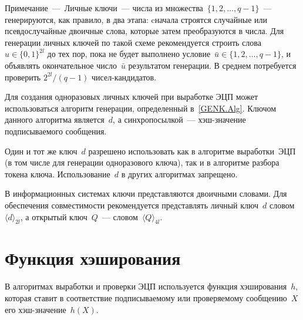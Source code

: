 \begin{note}
Примечание~---~Личные ключи~--- 
числа из множества~$\{1,2,\ldots,q-1\}$~--- 
генерируются, как правило, в два этапа: cначала строятся случайные 
или псевдослучайные двоичные слова, которые затем преобразуются в числа. 
Для генерации личных ключей по такой схеме 
рекомендуется строить слова~$u\in\{0,1\}^{2l}$ до тех пор, 
пока не будет выполнено условие~$\bar{u}\in\{1,2,\ldots,q-1\}$,
и объявлять окончательное число~$\bar{u}$ результатом генерации.
В среднем потребуется проверить $2^{2l}/(q-1)$ чисел-кандидатов.
\end{note}

%                                     

Для создания одноразовых личных ключей при выработке ЭЦП 
может использоваться алгоритм генерации, 
определенный в~\ref{GENK.Alg}.
%
Ключом данного алгоритма является~$d$,
а синхропосылкой~--- хэш-значение подписываемого сообщения.
  

Один и тот же ключ~$d$ разрешено использовать как в алгоритме выработки~ЭЦП 
(в том числе для генерации одноразового ключа), 
так и в алгоритме разбора токена ключа.
Использование~$d$ в других алгоритмах запрещено.

В информационных системах ключи представляются двоичными словами.
Для обеспечения совместимости рекомендуется представлять
личный ключ~$d$ словом~$\langle d\rangle_{2l}$,
а открытый ключ~$Q$~--- словом~$\langle Q\rangle_{4l}$.

\section{Функция хэширования}\label{COMMON.Hash}

В алгоритмах выработки и проверки ЭЦП используется функция 
хэширования~$h$, которая ставит в соответствие подписываемому или 
проверяемому сообщению~$X$ его хэш-значение~$h(X)$.
%

